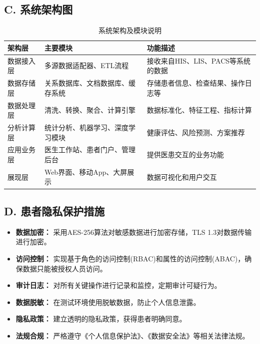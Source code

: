 \subsection*{C. 系统架构图}

\begin{table}[H]
  \centering
  \caption{系统架构及模块说明}
  \label{tab:architecture}
  \renewcommand{\arraystretch}{1.2}
  \begin{tabularx}{\textwidth}{LXL}
    \toprule
    \textbf{架构层} & \textbf{主要模块} & \textbf{功能描述} \\
    \midrule
    数据接入层 & 多源数据适配器、ETL流程 & 接收来自HIS、LIS、PACS等系统的数据 \\
    数据存储层 & 关系数据库、文档数据库、缓存系统 & 存储患者信息、检查结果、操作日志等 \\
    数据处理层 & 清洗、转换、聚合、计算引擎 & 数据标准化、特征工程、指标计算 \\
    分析计算层 & 统计分析、机器学习、深度学习模块 & 健康评估、风险预测、方案推荐 \\
    应用业务层 & 医生工作站、患者门户、管理后台 & 提供医患交互的业务功能 \\
    展现层 & Web界面、移动App、大屏展示 & 数据可视化和用户交互 \\
    \bottomrule
  \end{tabularx}
\end{table}

\subsection*{D. 患者隐私保护措施}

\begin{itemize}[itemindent=2em]
\item \textbf{数据加密：} 采用AES-256算法对敏感数据进行加密存储，TLS 1.3对数据传输进行加密。

\item \textbf{访问控制：} 实现基于角色的访问控制(RBAC)和属性的访问控制(ABAC)，确保数据只能被授权人员访问。

\item \textbf{审计日志：} 对所有关键操作进行记录和监控，定期审计可疑行为。

\item \textbf{数据脱敏：} 在测试环境使用脱敏数据，防止个人信息泄露。

\item \textbf{隐私政策：} 建立透明的隐私政策，获得患者明确同意。

\item \textbf{法规合规：} 严格遵守《个人信息保护法》、《数据安全法》等相关法律法规。
\end{itemize}

